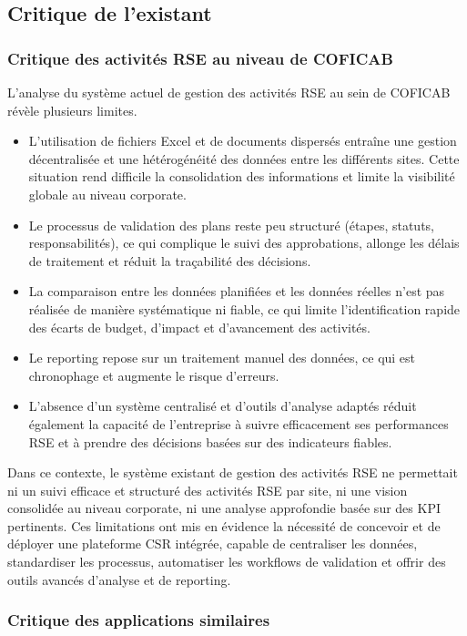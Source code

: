 \subsection{Critique de l’existant}

\subsubsection{Critique des activités RSE au niveau de COFICAB}

L’analyse du système actuel de gestion des activités RSE au sein de COFICAB révèle plusieurs limites. 
\begin{itemize}[label=\textbullet, itemsep=0.15ex, parsep=0pt, topsep=0pt, partopsep=0pt]
  \item L’utilisation de fichiers Excel et de documents dispersés entraîne une gestion décentralisée et une hétérogénéité des données entre les différents sites. Cette situation rend difficile la consolidation des informations et limite la visibilité globale au niveau corporate.
  \item Le processus de validation des plans reste peu structuré (étapes, statuts, responsabilités), ce qui complique le suivi des approbations, allonge les délais de traitement et réduit la traçabilité des décisions.
  \item La comparaison entre les données planifiées et les données réelles n’est pas réalisée de manière systématique ni fiable, ce qui limite l’identification rapide des écarts de budget, d’impact et d’avancement des activités.
  \item Le reporting repose sur un traitement manuel des données, ce qui est chronophage et augmente le risque d’erreurs.
  \item L’absence d’un système centralisé et d’outils d’analyse adaptés réduit également la capacité de l’entreprise à suivre efficacement ses performances RSE et à prendre des décisions basées sur des indicateurs fiables.
\end{itemize}
Dans ce contexte, le système existant de gestion des activités RSE ne permettait ni un suivi efficace et structuré des activités RSE par site, ni une vision consolidée au niveau corporate, ni une analyse approfondie basée sur des KPI pertinents. Ces limitations ont mis en évidence la nécessité de concevoir et de déployer une plateforme CSR intégrée, capable de centraliser les données, standardiser les processus, automatiser les workflows de validation et offrir des outils avancés d’analyse et de reporting.
\subsubsection{Critique des applications similaires}

